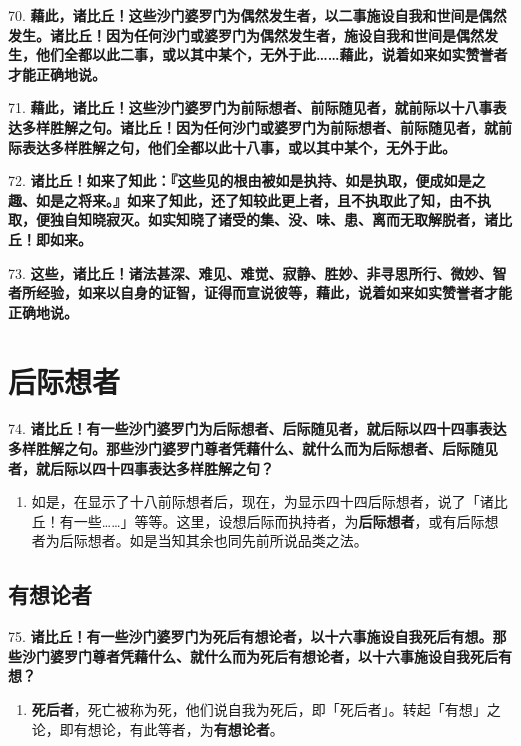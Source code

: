 {\Large 70.} \textbf{藉此，诸比丘！这些沙门婆罗门为偶然发生者，以二事施设自我和世间是偶然发生。诸比丘！因为任何沙门或婆罗门为偶然发生者，施设自我和世间是偶然发生，他们全都以此二事，或以其中某个，无外于此……藉此，说着如来如实赞誉者才能正确地说。}

{\Large 71.} \textbf{藉此，诸比丘！这些沙门婆罗门为前际想者、前际随见者，就前际以十八事表达多样胜解之句。诸比丘！因为任何沙门或婆罗门为前际想者、前际随见者，就前际表达多样胜解之句，他们全都以此十八事，或以其中某个，无外于此。}

{\Large 72.} \textbf{诸比丘！如来了知此：『这些见的根由被如是执持、如是执取，便成如是之趣、如是之将来。』如来了知此，还了知较此更上者，且不执取此了知，由不执取，便独自知晓寂灭。如实知晓了诸受的集、没、味、患、离而无取解脱者，诸比丘！即如来。}

{\Large 73.} \textbf{这些，诸比丘！诸法甚深、难见、难觉、寂静、胜妙、非寻思所行、微妙、智者所经验，如来以自身的证智，证得而宣说彼等，藉此，说着如来如实赞誉者才能正确地说。}

\section{后际想者}

{\Large 74.} \textbf{诸比丘！有一些沙门婆罗门为后际想者、后际随见者，就后际以四十四事表达多样胜解之句。那些沙门婆罗门尊者凭藉什么、就什么而为后际想者、后际随见者，就后际以四十四事表达多样胜解之句？}

\begin{enumerate}\item 如是，在显示了十八前际想者后，现在，为显示四十四后际想者，说了「诸比丘！有一些……」等等。这里，设想后际而执持者，为\textbf{后际想者}，或有后际想者为后际想者。如是当知其余也同先前所说品类之法。\end{enumerate}

\subsection{有想论者}

{\Large 75.} \textbf{诸比丘！有一些沙门婆罗门为死后有想论者，以十六事施设自我死后有想。那些沙门婆罗门尊者凭藉什么、就什么而为死后有想论者，以十六事施设自我死后有想？}

\begin{enumerate}\item \textbf{死后者}，死亡被称为死，他们说自我为死后，即「死后者」。转起「有想」之论，即有想论，有此等者，为\textbf{有想论者}。\end{enumerate}

